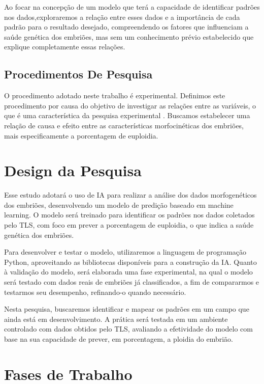 Ao focar na concepção de um modelo que terá a capacidade de identificar padrões nos dados,exploraremos a relação entre esses dados e a importância de cada padrão para o resultado desejado, compreendendo os fatores que influenciam a saúde genética dos embriões, mas sem um conhecimento prévio estabelecido que explique completamente essas relações.

\subsection{Procedimentos De Pesquisa}

O procedimento adotado neste trabalho é experimental. Definimos este procedimento por causa do objetivo de investigar as relações entre as variáveis, o que é uma característica da pesquisa experimental \cite{nascimento2016}. Buscamos estabelecer uma relação de causa e efeito entre as características morfocinéticas dos embriões, mais especificamente a porcentagem de euploidia.

\section{Design da Pesquisa}

Esse estudo adotará o uso de IA para realizar a análise dos dados morfogenéticos dos embriões, desenvolvendo um modelo de predição baseado em machine learning. O modelo será treinado para identificar os padrões nos dados coletados pelo TLS, com foco em prever a porcentagem de euploidia, o que indica a saúde genética dos embriões.

Para desenvolver e testar o modelo, utilizaremos a linguagem de programação Python, aproveitando as bibliotecas disponíveis para a construção da IA. Quanto à validação do modelo, será elaborada uma fase experimental, na qual o modelo será testado com dados reais de embriões já classificados, a fim de compararmos e testarmos seu desempenho, refinando-o quando necessário.

Nesta pesquisa, buscaremos identificar e mapear os padrões em um campo que ainda está em desenvolvimento. A prática será testada em um ambiente controlado com dados obtidos pelo TLS, avaliando a efetividade do modelo com base na sua capacidade de prever, em porcentagem, a ploidia do embrião.

\section{Fases de Trabalho}

